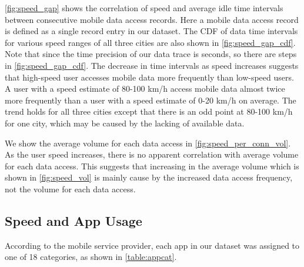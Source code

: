 \autoref{fig:speed_gap} shows the correlation of speed and average idle time intervals between consecutive mobile data access records. Here a mobile data access record is defined as a single record entry in our dataset. The CDF of data time intervals for various speed ranges of all three cities are also shown in \autoref{fig:speed_gap_cdf}. Note that since the time precision of our data trace is seconds, so there are steps in \autoref{fig:speed_gap_cdf}. The decrease in time intervals as speed increases suggests that high-speed user accesses mobile data more frequently than low-speed users. A user with a speed estimate of 80-100 km/h access mobile data almost twice more frequently than a user with a speed estimate of 0-20 km/h on average. The trend holds for all three cities except that there is an odd point at 80-100 km/h for one city, which may be caused by the lacking of available data.

We show the average volume for each data access in \autoref{fig:speed_per_conn_vol}. As the user speed increases, there is no apparent correlation with average volume for each data access. This suggests that increasing in the average volume which is shown in \autoref{fig:speed_vol} is mainly cause by the increased data access frequency, not the volume for each data access.

\subsection{Speed and App Usage}

According to the mobile service provider, each app in our dataset was assigned to one of 18 categories, as shown in \autoref{table:appcat}. 

